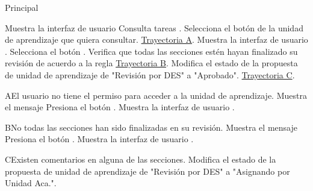 \begin{UCtrayectoria}{Principal}


    \UCpaso Muestra la interfaz de usuario Consulta tareas .
    \UCpaso [\UCactor] Selecciona el botón  de la unidad de aprendizaje que quiera consultar. \hyperref[SP2-CU1-A]{Trayectoria A}.
    \UCpaso  Muestra la interfaz de usuario .
    \UCpaso [\UCactor] Selecciona el botón .
    \UCpaso  Verifica que todas las secciones estén hayan finalizado su revisión de acuerdo a la regla   \hyperref[SP2-CU1-B]{Trayectoria B}.
    \UCpaso  Modifica el estado de la propuesta de unidad de aprendizaje de "Revisión por DES" a "Aprobado". \hyperref[SP2-CU1-C]{Trayectoria C}.

\end{UCtrayectoria}


\label{SP2-CU1-A}
\begin{UCtrayectoriaA}{A}{El usuario no tiene el permiso para acceder a la unidad de aprendizaje.}
    \UCpaso Muestra el mensaje 
    \UCpaso[\UCactor] Presiona el botón .
    \UCpaso  Muestra la interfaz de usuario .
\end{UCtrayectoriaA} 

\label{SP2-CU1-B}
\begin{UCtrayectoriaA}{B}{No todas las secciones han sido finalizadas en su revisión.}
    \UCpaso Muestra el mensaje 
    \UCpaso[\UCactor] Presiona el botón .
    \UCpaso  Muestra la interfaz de usuario .
\end{UCtrayectoriaA} 

\label{SP2-CU1-C}
\begin{UCtrayectoriaA}{C}{Existen comentarios en alguna de las secciones.}
 \UCpaso Modifica el estado de la propuesta de unidad de aprendizaje de "Revisión por DES" a "Asignando por Unidad Aca.".
\end{UCtrayectoriaA} 

